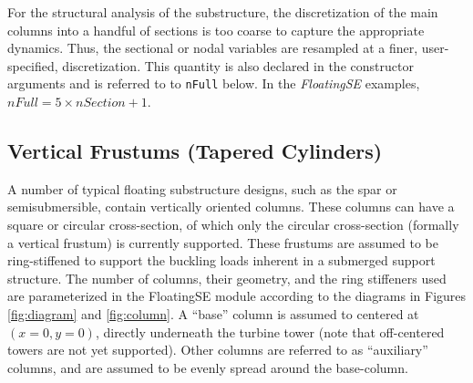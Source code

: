 For the structural analysis of the substructure, the
discretization of the main columns into a handful of sections is too
coarse to capture the appropriate dynamics.  Thus, the sectional or
nodal variables are resampled at a finer, user-specified,
discretization.  This quantity is also declared in the constructor
arguments and is referred to to \texttt{nFull} below.  In the \textit{FloatingSE}
examples, $nFull = 5\times nSection + 1$.

\subsection{Vertical Frustums (Tapered Cylinders)}
A number of typical floating substructure designs, such as the spar or
semisubmersible, contain vertically oriented columns.  These columns can
have a square or circular cross-section, of which only the circular
cross-section (formally a vertical frustum) is currently supported.
These frustums are assumed to be ring-stiffened to support the buckling
loads inherent in a submerged support structure.  The number of columns,
their geometry, and the ring stiffeners used are parameterized in the
FloatingSE module according to the diagrams in Figures \ref{fig:diagram}
and \ref{fig:column}.  A ``base'' column is
assumed to centered at $(x=0, y=0)$, directly underneath the turbine
tower (note that off-centered towers are not yet supported).  Other
columns are referred to as ``auxiliary'' columns, and are assumed to be
evenly spread around the base-column.
